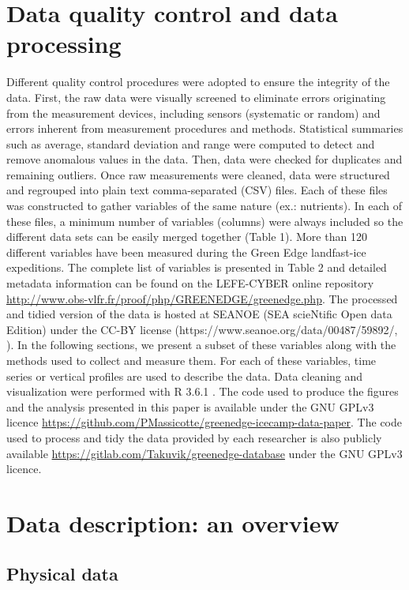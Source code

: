 \documentclass[essd, manuscript]{copernicus}
\begin{document}
\section{Data quality control and data processing}

Different quality control procedures were adopted to ensure the integrity of the data. First, the raw data were visually screened to eliminate errors originating from the measurement devices, including sensors (systematic or random) and errors inherent from measurement procedures and methods. Statistical summaries such as average, standard deviation and range were computed to detect and remove anomalous values in the data. Then, data were checked for duplicates and remaining outliers. Once raw measurements were cleaned, data were structured and regrouped into plain text comma-separated (CSV) files. Each of these files was constructed to gather variables of the same nature (ex.: nutrients). In each of these files, a minimum number of variables (columns) were always included so the different data sets can be easily merged together (Table 1). More than 120 different variables have been measured during the Green Edge landfast-ice expeditions. The complete list of variables is presented in Table 2 and detailed metadata information can be found on the LEFE-CYBER online repository \url{http://www.obs-vlfr.fr/proof/php/GREENEDGE/greenedge.php}. The processed and tidied version of the data is hosted at SEANOE (SEA scieNtific Open data Edition) under the CC-BY license (https://www.seanoe.org/data/00487/59892/, \citet{Massicotte201b}). In the following sections, we present a subset of these variables along with the methods used to collect and measure them. For each of these variables, time series or vertical profiles are used to describe the data. Data cleaning and visualization were performed with R 3.6.1 \citep{RCoreTeam2019}. The code used to produce the figures and the analysis presented in this paper is available under the GNU GPLv3 licence \url{https://github.com/PMassicotte/greenedge-icecamp-data-paper}. The code used to process and tidy the data provided by each researcher is also publicly available \url{https://gitlab.com/Takuvik/greenedge-database} under the GNU GPLv3 licence.

\section{Data description: an overview}

\subsection{Physical data}
\end{document}
